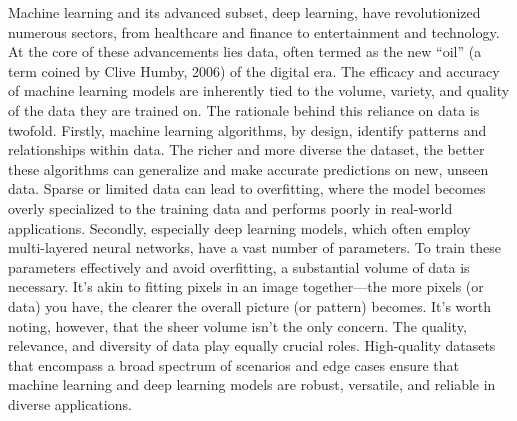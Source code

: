 \documentclass[
  10pt,
]{scrbook}
\begin{document}
Machine learning and its advanced subset, deep learning, have
revolutionized numerous sectors, from healthcare and finance to
entertainment and technology. At the core of these advancements lies
data, often termed as the new ``oil'' (a term coined by Clive Humby,
2006) of the digital era. The efficacy and accuracy of machine learning
models are inherently tied to the volume, variety, and quality of the
data they are trained on. The rationale behind this reliance on data is
twofold. Firstly, machine learning algorithms, by design, identify
patterns and relationships within data. The richer and more diverse the
dataset, the better these algorithms can generalize and make accurate
predictions on new, unseen data. Sparse or limited data can lead to
overfitting, where the model becomes overly specialized to the training
data and performs poorly in real-world applications. Secondly,
especially deep learning models, which often employ multi-layered neural
networks, have a vast number of parameters. To train these parameters
effectively and avoid overfitting, a substantial volume of data is
necessary. It's akin to fitting pixels in an image together---the more
pixels (or data) you have, the clearer the overall picture (or pattern)
becomes. It's worth noting, however, that the sheer volume isn't the
only concern. The quality, relevance, and diversity of data play equally
crucial roles. High-quality datasets that encompass a broad spectrum of
scenarios and edge cases ensure that machine learning and deep learning
models are robust, versatile, and reliable in diverse applications.
\end{document}
